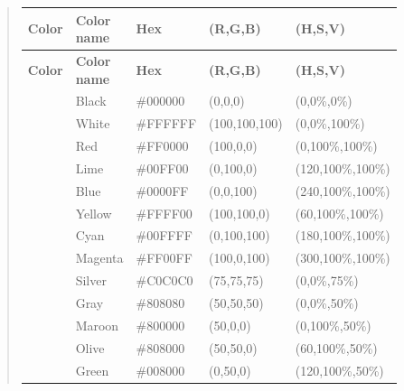 \begin{DoxyDescription}
\begin{DoxyPre}
\begin{DoxyPre} \begin{quote}
\tabulinesep=1mm
\begin{longtabu} spread 0pt [c]{*{5}{|X[-1]}|}
\hline
\rowcolor{\tableheadbgcolor}\textbf{ Color  }&\textbf{ Color~\newline
name }&\textbf{ Hex      }&\textbf{ (R,G,B)        }&\textbf{ (H,S,V)                  
 }\\
\endfirsthead
\hline
\endfoot
\hline
\rowcolor{\tableheadbgcolor}\textbf{ Color  }&\textbf{ Color~\newline
name }&\textbf{ Hex      }&\textbf{ (R,G,B)        }&\textbf{ (H,S,V)                  
 }\\
\endhead
~  &Black         &\#000000  &(0,0,0)        &(0\textordmasculine{},0\%,0\%)        
 \\
~  &White         &#FFFFFF  &(100,100,100)  &(0\textordmasculine{},0\%,100\%)      
 \\
~  &Red           &#FF0000  &(100,0,0)      &(0\textordmasculine{},100\%,100\%)    
 \\
~  &Lime          &\#00FF00  &(0,100,0)      &(120\textordmasculine{},100\%,100\%)  
 \\
~  &Blue          &\#0000FF  &(0,0,100)      &(240\textordmasculine{},100\%,100\%)  
 \\
~  &Yellow        &#FFFF00  &(100,100,0)    &(60\textordmasculine{},100\%,100\%)   
 \\
~  &Cyan          &\#00FFFF  &(0,100,100)    &(180\textordmasculine{},100\%,100\%)  
 \\
~  &Magenta       &#FF00FF  &(100,0,100)    &(300\textordmasculine{},100\%,100\%)  
 \\
~  &Silver        &#C0C0C0  &(75,75,75)     &(0\textordmasculine{},0\%,75\%)       
 \\
~  &Gray          &\#808080  &(50,50,50)     &(0\textordmasculine{},0\%,50\%)       
 \\
~  &Maroon        &\#800000  &(50,0,0)       &(0\textordmasculine{},100\%,50\%)     
 \\
~  &Olive         &\#808000  &(50,50,0)      &(60\textordmasculine{},100\%,50\%)    
 \\
~  &Green         &\#008000  &(0,50,0)       &(120\textordmasculine{},100\%,50\%)   
 \\

\end{longtabu}
\end{quote}
\end{DoxyPre}
\end{DoxyPre}
\end{DoxyDescription}
